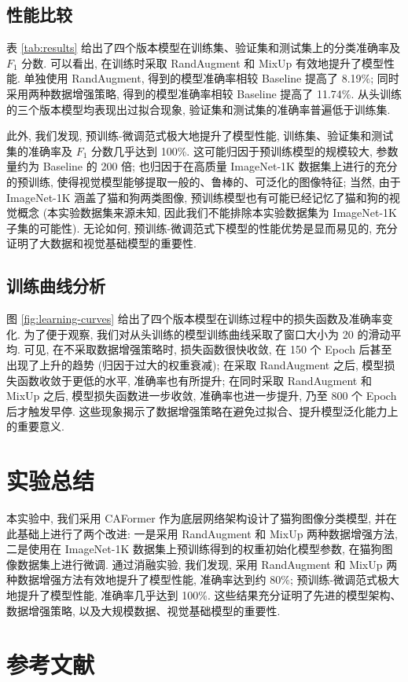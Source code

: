 \documentclass[12pt,a4paper]{article}
\begin{document}
\subsection{性能比较}

表 \ref{tab:results} 给出了四个版本模型在训练集、验证集和测试集上的分类准确率及 $F_1$ 分数. 可以看出, 在训练时采取 RandAugment 和 MixUp 有效地提升了模型性能. 单独使用 RandAugment, 得到的模型准确率相较 Baseline 提高了 8.19\%;
同时采用两种数据增强策略, 得到的模型准确率相较 Baseline 提高了 11.74\%. 从头训练的三个版本模型均表现出过拟合现象, 验证集和测试集的准确率普遍低于训练集.

此外, 我们发现, 预训练-微调范式极大地提升了模型性能, 训练集、验证集和测试集的准确率及 $F_1$ 分数几乎达到 100\%. 这可能归因于预训练模型的规模较大, 参数量约为 Baseline 的 200 倍; 也归因于在高质量 ImageNet-1K 数据集上进行的充分的预训练, 使得视觉模型能够提取一般的、鲁棒的、可泛化的图像特征; 当然, 由于 ImageNet-1K 涵盖了猫和狗两类图像, 预训练模型也有可能已经记忆了猫和狗的视觉概念 (本实验数据集来源未知, 因此我们不能排除本实验数据集为 ImageNet-1K 子集的可能性). 无论如何, 预训练-微调范式下模型的性能优势是显而易见的, 充分证明了大数据和视觉基础模型的重要性.

\subsection{训练曲线分析}

图 \ref{fig:learning-curves} 给出了四个版本模型在训练过程中的损失函数及准确率变化. 为了便于观察, 我们对从头训练的模型训练曲线采取了窗口大小为 20 的滑动平均. 可见, 在不采取数据增强策略时, 损失函数很快收敛, 在 150 个 Epoch 后甚至出现了上升的趋势 (归因于过大的权重衰减); 在采取 RandAugment 之后, 模型损失函数收敛于更低的水平, 准确率也有所提升; 在同时采取 RandAugment 和 MixUp 之后, 模型损失函数进一步收敛, 准确率也进一步提升, 乃至 800 个 Epoch 后才触发早停. 这些现象揭示了数据增强策略在避免过拟合、提升模型泛化能力上的重要意义.

\section{实验总结}

本实验中, 我们采用 CAFormer 作为底层网络架构设计了猫狗图像分类模型, 并在此基础上进行了两个改进: 一是采用 RandAugment 和 MixUp 两种数据增强方法, 二是使用在 ImageNet-1K 数据集上预训练得到的权重初始化模型参数, 在猫狗图像数据集上进行微调. 通过消融实验, 我们发现, 采用 RandAugment 和 MixUp 两种数据增强方法有效地提升了模型性能, 准确率达到约 80\%; 预训练-微调范式极大地提升了模型性能, 准确率几乎达到 100\%. 这些结果充分证明了先进的模型架构、数据增强策略, 以及大规模数据、视觉基础模型的重要性.

\section{参考文献}

\renewcommand{\bibsection}{}


\end{document}
